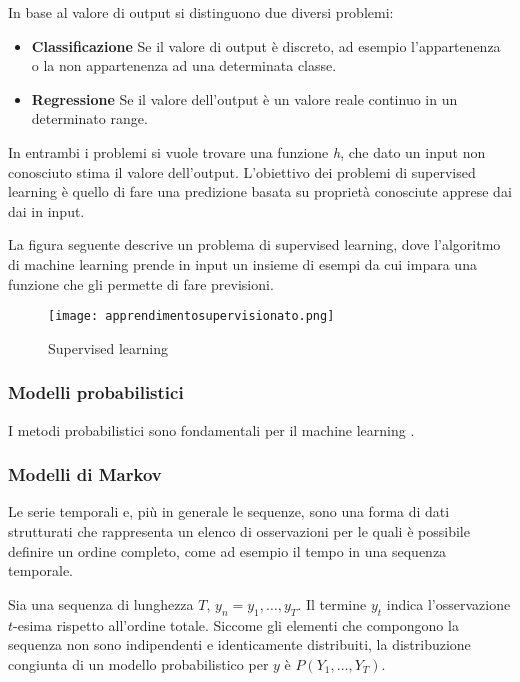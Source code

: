 \documentclass[../main.tex]{subfiles}
\begin{document}
In base al valore di output si distinguono due diversi problemi:

\begin{itemize}
				\item \textbf{Classificazione} Se il valore di output è discreto, ad esempio l'appartenenza o la non appartenenza ad una determinata classe.
				\item \textbf{Regressione} Se il valore dell'output è un valore reale continuo in un determinato range.
\end{itemize}

In entrambi i problemi si vuole trovare una funzione \textit{h}, che dato un input non conosciuto stima il valore dell'output. L'obiettivo dei problemi di supervised learning è quello di fare una predizione basata su proprietà conosciute apprese dai dai in input.

La figura seguente descrive un problema di supervised learning, dove l'algoritmo di machine learning prende in input un insieme di esempi da cui impara una funzione che gli permette di fare previsioni.

\begin{figure}[H]
				\centering
				\texttt{[image: apprendimentosupervisionato.png]}
				\caption{Supervised learning}
\end{figure}

\subsubsection{Modelli probabilistici}
I metodi probabilistici sono fondamentali per il machine learning \cite{compIntelligence}.

\subsubsection{Modelli di Markov}
Le serie temporali e, più in generale le sequenze, sono una forma di dati strutturati che rappresenta un elenco di osservazioni per le quali è possibile definire un ordine completo, come ad esempio il tempo in una sequenza temporale.

Sia una sequenza di lunghezza $T$, $ { y } _ { n } = y _ { 1 } , \dots , y _ { T }$. Il termine ${y} _ {t}$ indica l'osservazione $t$-esima rispetto all'ordine totale. Siccome gli elementi che compongono la sequenza non sono indipendenti e identicamente distribuiti, la distribuzione congiunta di un modello probabilistico per $y$ è $P \left( Y _ { 1 } , \ldots , Y _ { T } \right)$.
\end{document}
